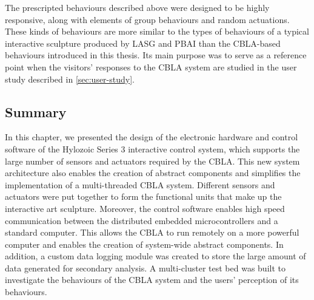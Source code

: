The prescripted behaviours described above were designed to be highly responsive, along with elements of group behaviours and random actuations. These kinds of behaviours are more similar to the types of behaviours of a typical interactive sculpture produced by LASG and PBAI than the CBLA-based behaviours introduced in this thesis. Its main purpose was to serve as a reference point when the visitors' responses to the CBLA system are studied in the user study described in \ref{sec:user-study}.

\subsection{Summary}

In this chapter, we presented the design of the electronic hardware and control software of the Hylozoic Series 3 interactive control system, which supports the large number of sensors and actuators required by the CBLA. This new system architecture also enables the creation of abstract components and simplifies the implementation of a multi-threaded CBLA system.
Different sensors and actuators were put together to form the functional units that make up the interactive art sculpture. Moreover, the control software enables high speed communication between the distributed embedded microcontrollers and a standard computer. This allows the CBLA to run remotely on a more powerful computer and enables the creation of system-wide abstract components. In addition, a custom data logging module was created to store the large amount of data generated for secondary analysis. A multi-cluster test bed was built to investigate the behaviours of the CBLA system and the users' perception of its behaviours.

